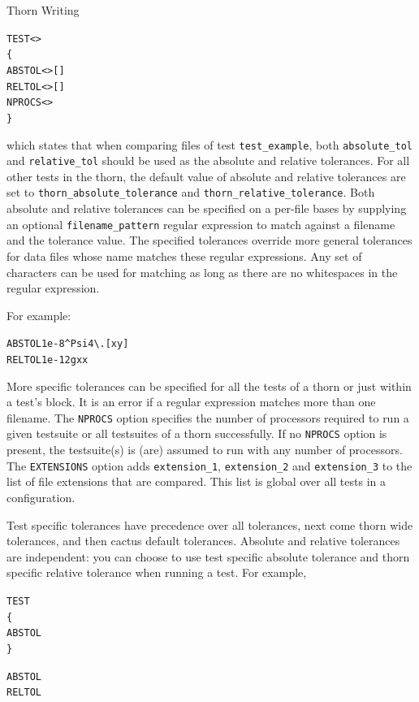 \begin{cactuspart}{Thorn Writing}
\begin{alltt}
TEST <>
\{
  ABSTOL <> []
  RELTOL <> []
  NPROCS <>
\}
\end{alltt}

which states that when comparing files of test \verb|test_example|, both
\verb|absolute_tol| and \verb|relative_tol| should be used as
the absolute and relative tolerances. For all other tests in the
thorn, the default value of absolute and relative tolerances are set
to \verb|thorn_absolute_tolerance| and \verb|thorn_relative_tolerance|.
Both absolute and relative tolerances can be specified on a per-file
bases by supplying an optional \verb|filename_pattern| regular expression
to match against a filename and the tolerance value. The specified
tolerances override more general tolerances for data files whose name
matches these regular expressions. Any set of characters can be used for
matching as long as there are no whitespaces in the regular expression.

For example:

\begin{alltt}
ABSTOL 1e-8 ^Psi4\textbackslash.[xy]
RELTOL 1e-12 gxx
\end{alltt}

More specific tolerances can be specified for all the tests of a thorn
or just within a test's block. It is an error if a regular expression
matches more than one filename.
The \texttt{NPROCS} option specifies the number of processors required to
run a given testsuite  or all testsuites of a thorn
successfully. If no \texttt{NPROCS} option is present, the testsuite(s)
is (are) assumed to run with any number of processors.
The \texttt{EXTENSIONS} option adds
\verb|extension_1|, \verb|extension_2| and \verb|extension_3| to the
list of file extensions that are compared. This list is global over
all tests in a configuration.

Test specific tolerances have precedence over all tolerances, next
come thorn wide tolerances, and then cactus default tolerances.
Absolute and relative tolerances are independent: you can choose to
use test specific absolute tolerance and thorn specific relative
tolerance when running a test. For example,

\begin{alltt}
TEST 
\{
  ABSTOL 
\}

ABSTOL  
RELTOL  
\end{alltt}


\end{cactuspart}
